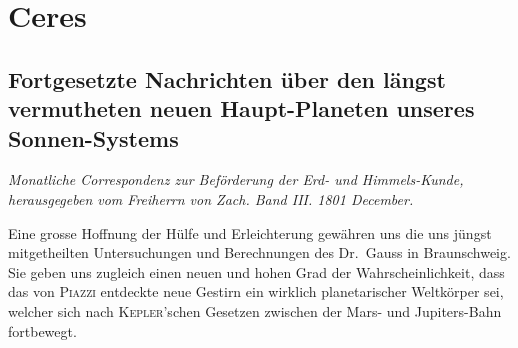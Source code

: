 \documentclass[11pt,a4paper]{book}
\begin{document}
\chapter*{Ceres}

\section*{Fortgesetzte Nachrichten über den längst vermutheten neuen Haupt-Planeten unseres Sonnen-Systems}

\begin{center}
\textit{Monatliche Correspondenz zur Beförderung der Erd- und Himmels-Kunde,\\
herausgegeben vom Freiherrn von Zach. Band III. 1801 December.}
\end{center}

Eine grosse Hoffnung der Hülfe und Erleichterung gewähren uns die uns jüngst mitgetheilten Untersuchungen und Berechnungen des Dr.~Gauss in Braunschweig. Sie geben uns zugleich einen neuen und hohen Grad der Wahrscheinlichkeit, dass das von \textsc{Piazzi} entdeckte neue Gestirn ein wirklich planetarischer Weltkörper sei, welcher sich nach \textsc{Kepler}'schen Gesetzen zwischen der Mars- und Jupiters-Bahn fortbewegt.
\end{document}
